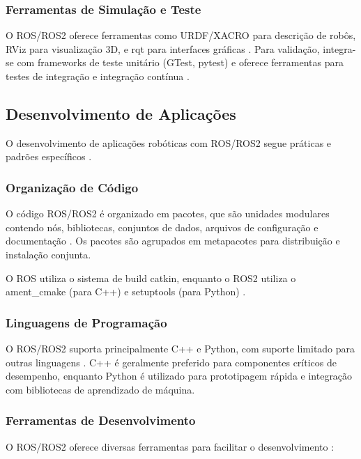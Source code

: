 \subsubsection{Ferramentas de Simulação e Teste}

O ROS/ROS2 oferece ferramentas como URDF/XACRO para descrição de robôs, RViz para visualização 3D, e rqt para interfaces gráficas \cite{Joseph2018, Macenski2022}. Para validação, integra-se com frameworks de teste unitário (GTest, pytest) e oferece ferramentas para testes de integração e integração contínua \cite{Joseph2018, Macenski2022}.

\subsection{Desenvolvimento de Aplicações}

O desenvolvimento de aplicações robóticas com ROS/ROS2 segue práticas e padrões específicos \cite{Joseph2018, Macenski2022}.

\subsubsection{Organização de Código}

O código ROS/ROS2 é organizado em pacotes, que são unidades modulares contendo nós, bibliotecas, conjuntos de dados, arquivos de configuração e documentação \cite{Joseph2018}. Os pacotes são agrupados em metapacotes para distribuição e instalação conjunta.

O ROS utiliza o sistema de build catkin, enquanto o ROS2 utiliza o ament_cmake (para C++) e setuptools (para Python) \cite{Macenski2022}.

\subsubsection{Linguagens de Programação}

O ROS/ROS2 suporta principalmente C++ e Python, com suporte limitado para outras linguagens \cite{Joseph2018, Macenski2022}. C++ é geralmente preferido para componentes críticos de desempenho, enquanto Python é utilizado para prototipagem rápida e integração com bibliotecas de aprendizado de máquina.

\subsubsection{Ferramentas de Desenvolvimento}

O ROS/ROS2 oferece diversas ferramentas para facilitar o desenvolvimento \cite{Joseph2018, Macenski2022}:

